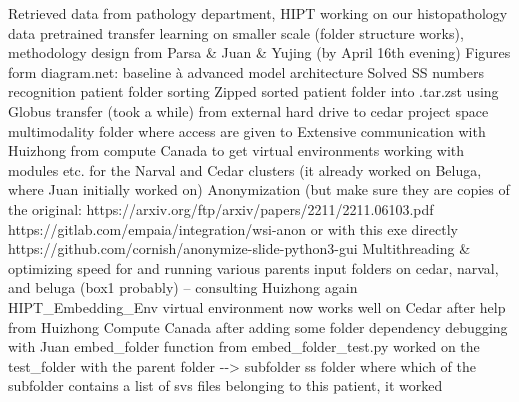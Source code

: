 \documentclass{article}%
\begin{document}
%
Retrieved data from pathology department, %
\newline%
\newline%
%
HIPT working on our histopathology data pretrained transfer learning on smaller scale (folder structure works), methodology design from Parsa \& Juan \& Yujing (by April 16th evening)%
\newline%
\newline%
%
Figures form diagram.net: baseline à advanced model architecture %
\newline%
\newline%
%
Solved SS numbers recognition patient folder sorting %
\newline%
\newline%
%
Zipped sorted patient folder into .tar.zst using Globus transfer (took a while) from external hard drive to cedar project space multimodality folder where access are given to %
\newline%
\newline%
%
Extensive communication with Huizhong from compute Canada to get virtual environments working with modules etc. for the Narval and Cedar clusters (it already worked on Beluga, where Juan initially worked on) %
\newline%
\newline%
%
Anonymization (but make sure they are copies of the original: %
\newline%
\newline%
%
https://arxiv.org/ftp/arxiv/papers/2211/2211.06103.pdf%
\newline%
\newline%
%
https://gitlab.com/empaia/integration/wsi{-}anon%
\newline%
\newline%
%
or with this exe directly https://github.com/cornish/anonymize{-}slide{-}python3{-}gui%
\newline%
\newline%
%
Multithreading \& optimizing speed for and running various parents input folders on cedar, narval, and beluga (box1 probably) – consulting Huizhong again  %
\newline%
\newline%
%
HIPT\_Embedding\_Env virtual environment now works well on Cedar after help from Huizhong Compute Canada after adding some folder dependency debugging with Juan%
\newline%
\newline%
%
embed\_folder function from embed\_folder\_test.py worked on the test\_folder with the parent folder {-}{-}> subfolder ss folder where which of the subfolder contains a list of svs files belonging to this patient, it worked %
\end{document}
